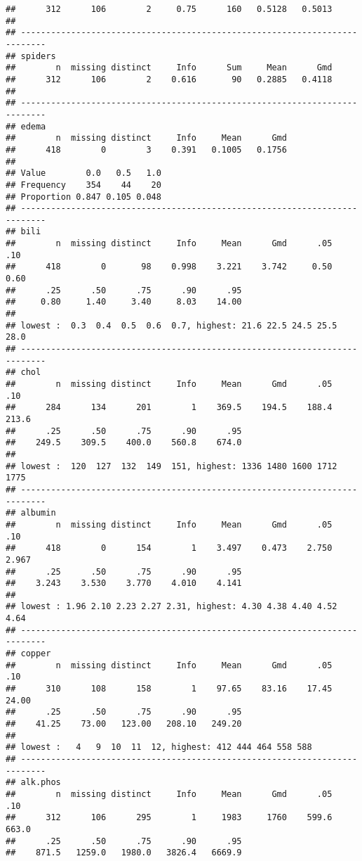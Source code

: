 \documentclass[]{book}
\theoremstyle{definition}
\theoremstyle{definition}
\theoremstyle{definition}
\theoremstyle{remark}
\begin{document}
\begin{verbatim}
##      312      106        2     0.75      160   0.5128   0.5013 
## 
## ---------------------------------------------------------------------------
## spiders 
##        n  missing distinct     Info      Sum     Mean      Gmd 
##      312      106        2    0.616       90   0.2885   0.4118 
## 
## ---------------------------------------------------------------------------
## edema 
##        n  missing distinct     Info     Mean      Gmd 
##      418        0        3    0.391   0.1005   0.1756 
##                             
## Value        0.0   0.5   1.0
## Frequency    354    44    20
## Proportion 0.847 0.105 0.048
## ---------------------------------------------------------------------------
## bili 
##        n  missing distinct     Info     Mean      Gmd      .05      .10 
##      418        0       98    0.998    3.221    3.742     0.50     0.60 
##      .25      .50      .75      .90      .95 
##     0.80     1.40     3.40     8.03    14.00 
## 
## lowest :  0.3  0.4  0.5  0.6  0.7, highest: 21.6 22.5 24.5 25.5 28.0
## ---------------------------------------------------------------------------
## chol 
##        n  missing distinct     Info     Mean      Gmd      .05      .10 
##      284      134      201        1    369.5    194.5    188.4    213.6 
##      .25      .50      .75      .90      .95 
##    249.5    309.5    400.0    560.8    674.0 
## 
## lowest :  120  127  132  149  151, highest: 1336 1480 1600 1712 1775
## ---------------------------------------------------------------------------
## albumin 
##        n  missing distinct     Info     Mean      Gmd      .05      .10 
##      418        0      154        1    3.497    0.473    2.750    2.967 
##      .25      .50      .75      .90      .95 
##    3.243    3.530    3.770    4.010    4.141 
## 
## lowest : 1.96 2.10 2.23 2.27 2.31, highest: 4.30 4.38 4.40 4.52 4.64
## ---------------------------------------------------------------------------
## copper 
##        n  missing distinct     Info     Mean      Gmd      .05      .10 
##      310      108      158        1    97.65    83.16    17.45    24.00 
##      .25      .50      .75      .90      .95 
##    41.25    73.00   123.00   208.10   249.20 
## 
## lowest :   4   9  10  11  12, highest: 412 444 464 558 588
## ---------------------------------------------------------------------------
## alk.phos 
##        n  missing distinct     Info     Mean      Gmd      .05      .10 
##      312      106      295        1     1983     1760    599.6    663.0 
##      .25      .50      .75      .90      .95 
##    871.5   1259.0   1980.0   3826.4   6669.9 

\end{verbatim}
\end{document}
